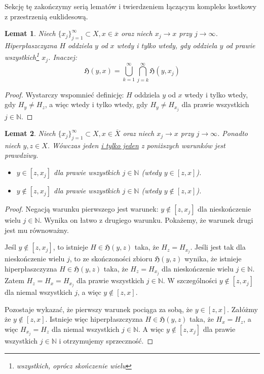 \documentclass[licencjacka]{pracamgr}
\theoremstyle{definition}
\theoremstyle{definition}
\theoremstyle{definition}
\theoremstyle{definition}
\theoremstyle{definition}
\theoremstyle{plain}
\newtheorem{lemma}{Lemat}[section]
\theoremstyle{plain}
\begin{document}
Sekcję tę zakończymy serią lematów i twierdzeniem łączącym kompleks 
kostkowy z przestrzenią euklidesową.

\begin{lemma}
	Niech $ \{x_j\}_{j = 1}^{\infty} \subset X, x \in \overline{x} $ oraz niech 
	$ x_j \rightarrow x$ przy $ j \rightarrow \infty $. Hiperpłaszczyzna $ H $ 
	oddziela $ y $ od $ x $ wtedy i tylko wtedy, gdy oddziela $ y $ od prawie 
	wszystkich\footnote{wszystkich, oprócz skończenie wielu} $ x_j $. Inaczej:
	$$ \mathfrak{H}(y,x) = \bigcup\limits_{k = 1}^{\infty} \bigcap\limits_{j = k}^{\infty}
	\mathfrak{H}(y,x_j) $$
\end{lemma}
\begin{proof}
	Wystarczy wspomnieć definicję: $ H $ oddziela $ y $ od $ x $ wtedy i tylko wtedy, gdy 
	$ H_y \neq H_z $, a więc wtedy i tylko wtedy, gdy $H_y \neq H_{x_j} $ dla prawie 
	wszystkich $ j \in \mathbb{N} $. 
\end{proof}
\begin{lemma}
	Niech $ \{x_j\}_{j = 1}^{\infty} \subset X, x \in \overline{X} $ oraz niech 
	$ x_j \rightarrow x$ przy $ j \rightarrow \infty $. Ponadto niech $ y,z \in X $. 
	Wówczas jeden \underline{i tylko jeden} z poniższych warunków jest prawdziwy.
	\begin{itemize}
		\item $ y \in [z,x_j] $ dla prawie wszystkich $ j \in \mathbb{N} $
		(wtedy $ y \in [z,x]$).
		\item $ y \notin [z,x_j] $ dla prawie wszystkich $ j \in \mathbb{N} $
		(wtedy $ y \notin [z,x] $).
	\end{itemize}
\end{lemma}
\begin{proof}
	Negacją warunku pierwszego jest warunek: $ y \notin [z,x_j] $ dla nieskończenie 
	wielu $ j \in \mathbb{N} $. Wynika on łatwo z drugiego warunku. Pokażemy, że warunek 
	drugi jest mu równoważny.
	
	Jeśl $ y \notin [z,x_j]  $, to istnieje $ H \in \mathfrak{H}(y,z) $ taka, że 
	$ H_z = H_{x_j} $. %
	Jeśli jest tak dla nieskończenie wielu $ j $, to ze skończoności zbioru 
	$ \mathfrak{H}(y,z) $ wynika, że istnieje hiperpłaszczyzna 
	$ H \in \mathfrak{H}(y,z)$ taka, że $ H_{z} = H_{x_j} $ dla nieskończenie wielu $ j \in 
	\mathbb{N} $. Zatem $ H_z = H_x = H_{x_j} $ dla prawie wszystkich $ j \in \mathbb{N} $. 
	W szczególności $ y \notin [z,x_j] $ dla niemal wszystkich $ j $, a więc 
	$ y \notin [z,x] $.
	
	Pozostaje wykazać, że pierwszy warunek pociąga za sobą, że $ y \in [z,x] $.
	Załóżmy że $ y \notin [z,x] $. Istnieje więc hiperpłaszczyzna  
	$ H \in \mathfrak{H}(y,z) $ taka, że $ H_x = H_z $, a więc $ H_{x_j} = H_{z} $ dla 
	niemal wszystkich $ j \in \mathbb{N} $. A więc $ y \notin [z,x_j] $ dla 
	prawie wszystkich $ j \in \mathbb{N} $ i otrzymujemy sprzeczność.
\end{proof}
\end{document}
